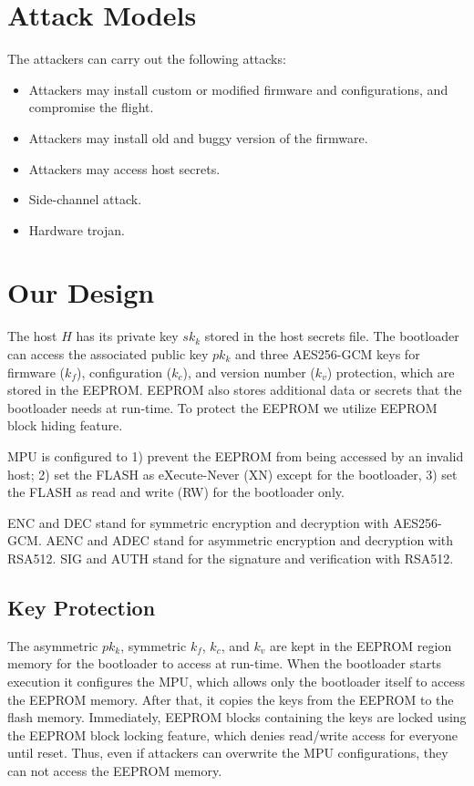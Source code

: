 \documentclass[11pt,oneside,onecolumn,letterpaper]{article}
\begin{document}
\section{Attack Models}

The attackers can carry out the following attacks:

\begin{itemize}
  \item Attackers may install custom or modified firmware and configurations, and compromise the flight.
  \item Attackers may install old and buggy version of the firmware.
  \item Attackers may access host secrets.
  \item Side-channel attack.
  \item Hardware trojan.
\end{itemize}


\section{Our Design}

The host $H$ has its private key $sk_k$ stored in the host secrets file.
The bootloader can access the associated public key $pk_k$ and three AES256-GCM keys for firmware ($k_f$), configuration ($k_c$), and version number ($k_v$) protection, which are stored in the EEPROM.
EEPROM also stores additional data or secrets that the bootloader needs at run-time.
To protect the EEPROM we utilize EEPROM block hiding feature.

MPU is configured to 1) prevent the EEPROM from being accessed by an invalid host; 2) set the FLASH as eXecute-Never (XN) except for the bootloader, 3) set the FLASH as read and write (RW) for the bootloader only. 

ENC and DEC stand for symmetric encryption and decryption with AES256-GCM.
AENC and ADEC stand for asymmetric encryption and decryption with RSA512.
SIG and AUTH stand for the signature and verification with RSA512.

\subsection{Key Protection}
The asymmetric $pk_k$, symmetric $k_f$, $k_c$, and $k_v$ are kept in the EEPROM region memory for the bootloader to access at run-time.
When the bootloader starts execution it configures the MPU, which allows only the bootloader itself to access the EEPROM memory.
After that, it copies the keys from the EEPROM to the flash memory.
Immediately, EEPROM blocks containing the keys are locked using the EEPROM block locking feature, which denies read/write access for everyone until reset.
Thus, even if attackers can overwrite the MPU configurations, they can not access the EEPROM memory.
\end{document}
